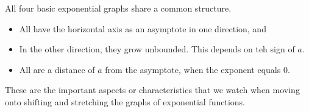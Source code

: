 \documentclass{ximera}
\begin{document}
All four basic exponential graphs share a common structure.


\begin{itemize}
\item All have the horizontal axis as an asymptote in one direction, and
\item In the other direction, they grow unbounded. This depends on teh sign of $a$.
\item All are a distance of $a$ from the asymptote, when the exponent equals $0$.
\end{itemize}

These are the important aspects or characteristics that we watch when moving onto shifting and stretching the graphs of exponential functions.
\end{document}
